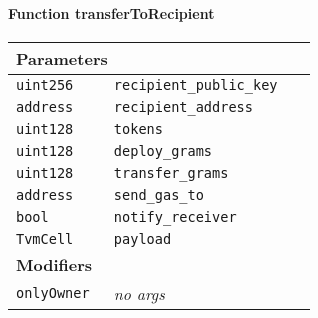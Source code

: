 \paragraph{Function transferToRecipient}


\ifsoltables
\noindent\begin{tabular}{|l|l|p{5cm}|}\hline
\multicolumn{3}{|l|}{\bf Parameters}\\\hline
\tt uint256 & \tt recipient\_{}public\_{}key &\\\hline
\tt address & \tt recipient\_{}address &\\\hline
\tt uint128 & \tt tokens &\\\hline
\tt uint128 & \tt deploy\_{}grams &\\\hline
\tt uint128 & \tt transfer\_{}grams &\\\hline
\tt address & \tt send\_{}gas\_{}to &\\\hline
\tt bool & \tt notify\_{}receiver &\\\hline
\tt TvmCell & \tt payload &\\\hline
\multicolumn{3}{|l|}{\bf Modifiers}\\\hline
\tt onlyOwner & {\em no args} &\\\hline
\end{tabular}
\fi

\vspace{2cm}

